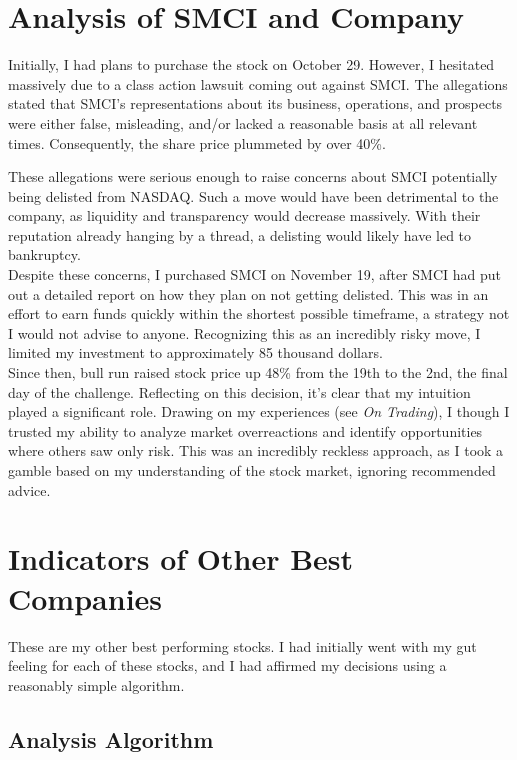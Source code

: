 \documentclass[a4paper, 12pt]{article}
\begin{document}
\section{Analysis of SMCI and Company}

Initially, I had plans to purchase the stock on October 29. However, I hesitated massively due to a 
class action lawsuit coming out against SMCI. The allegations stated that SMCI's representations 
about its business, operations, and prospects were either false, misleading, and/or lacked a 
reasonable basis at all relevant times. Consequently, the share price plummeted by over 40\%.

These allegations were serious enough to raise concerns about SMCI potentially being delisted 
from NASDAQ. Such a move would have been detrimental to the company, as liquidity and transparency 
would decrease massively. With their reputation already hanging by a thread, a delisting would likely 
have led to bankruptcy. \\

Despite these concerns, I purchased SMCI on November 19, after SMCI had put out a detailed report 
on how they plan on not getting delisted. This was in an effort to earn funds quickly within 
the shortest possible timeframe, a strategy not I would not advise to anyone.
Recognizing this as an incredibly risky move, I limited my investment to approximately 
85 thousand dollars. \\

Since then, bull run raised stock price up 48\% from the 19th to the 2nd, the final day of the challenge. Reflecting 
on this decision, it’s clear that my intuition played a significant role.  Drawing on my experiences (see \textit{On Trading}), 
I though I trusted my ability to analyze market overreactions and identify opportunities where others saw only risk. 
This was an incredibly reckless approach, as I took a gamble based on my
understanding of the stock market, ignoring recommended advice. \\

\section{Indicators of Other Best Companies}

These are my other best performing stocks.
I had initially went with my gut feeling for each of these stocks,
and I had affirmed my decisions using a reasonably simple algorithm.

\subsection{Analysis Algorithm} %
\end{document}
